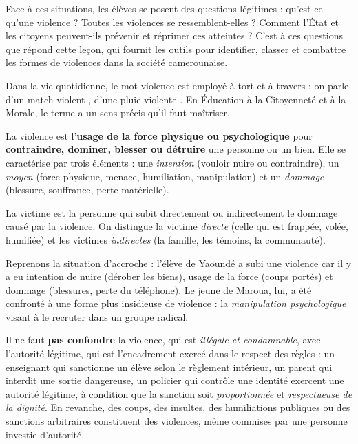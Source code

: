 \documentclass[11pt]{article}
\newcommand{\cle}[1]{{\popxbold\color{popdark}#1}}
\newcounter{popsec}
\newcounter{popsub}
\newcommand{\courssub}[1]{%
  \stepcounter{popsub}%
  \par\vspace{9pt}\noindent{\popxbold\fontsize{11.5}{13}\selectfont\color{popink}{\color{poporange}\thepopsec.\thepopsub}\hspace{6pt}#1}\par\nopagebreak\vspace{4pt}
}
\begin{document}
Face à ces situations, les élèves se posent des questions légitimes : qu'est-ce qu'une violence ? Toutes les violences se ressemblent-elles ? Comment l'État et les citoyens peuvent-ils prévenir et réprimer ces atteintes ? C'est à ces questions que répond cette leçon, qui fournit les outils pour \cle{identifier}, \cle{classer} et \cle{combattre} les formes de violences dans la société camerounaise.

\courssub{Définition de la violence et de la victime}

Dans la vie quotidienne, le mot \og violence \fg{} est employé à tort et à travers : on parle d'un match \og violent \fg{}, d'une pluie \og violente \fg{}. En Éducation à la Citoyenneté et à la Morale, le terme a un sens précis qu'il faut maîtriser.

\begin{definition}
La \cle{violence} est l'\textbf{usage de la force physique ou psychologique} pour \textbf{contraindre, dominer, blesser ou détruire} une personne ou un bien. Elle se caractérise par trois éléments : une \emph{intention} (vouloir nuire ou contraindre), un \emph{moyen} (force physique, menace, humiliation, manipulation) et un \emph{dommage} (blessure, souffrance, perte matérielle).\par
La \cle{victime} est la personne qui subit directement ou indirectement le dommage causé par la violence. On distingue la victime \emph{directe} (celle qui est frappée, volée, humiliée) et les victimes \emph{indirectes} (la famille, les témoins, la communauté).
\end{definition}

Reprenons la situation d'accroche : l'élève de Yaoundé a subi une violence car il y a eu intention de nuire (dérober les biens), usage de la force (coups portés) et dommage (blessures, perte du téléphone). Le jeune de Maroua, lui, a été confronté à une forme plus insidieuse de violence : la \emph{manipulation psychologique} visant à le recruter dans un groupe radical.

\begin{attention}
Il ne faut \textbf{pas confondre} la violence, qui est \emph{illégale et condamnable}, avec l'\cle{autorité légitime}, qui est l'encadrement exercé dans le respect des règles : un enseignant qui sanctionne un élève selon le règlement intérieur, un parent qui interdit une sortie dangereuse, un policier qui contrôle une identité exercent une autorité légitime, à condition que la sanction soit \emph{proportionnée} et \emph{respectueuse de la dignité}. En revanche, des coups, des insultes, des humiliations publiques ou des sanctions arbitraires constituent des violences, même commises par une personne investie d'autorité.
\end{attention}
\end{document}

